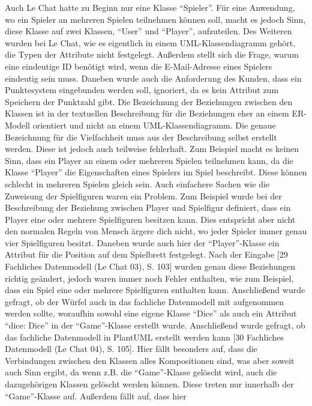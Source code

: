 Auch Le Chat hatte zu Beginn nur eine Klasse ``Spieler''. Für eine Anwendung, wo ein Spieler an mehreren Spielen teilnehmen können soll, 
macht es jedoch Sinn, diese Klasse auf zwei Klassen, ``User'' und ``Player'', aufzuteilen. Des Weiteren wurden bei Le Chat, wie es eigentlich 
in einem UML-Klassendiagramm gehört, die Typen der Attribute nicht festgelegt. Außerdem stellt sich die Frage, warum eine eindeutige 
ID benötigt wird, wenn die E-Mail-Adresse eines Spielers eindeutig sein muss. Daneben wurde auch die Anforderung des Kunden, dass ein 
Punktesystem eingebunden werden soll, ignoriert, da es kein Attribut zum Speichern der Punktzahl gibt. Die Bezeichnung der Beziehungen 
zwischen den Klassen ist in der textuellen Beschreibung für die Beziehungen eher an einem ER-Modell orientiert und nicht an einem 
UML-Klassendiagramm. Die genaue Bezeichnung für die Vielfachheit muss aus der Beschreibung selbst erstellt werden. Diese ist jedoch auch 
teilweise fehlerhaft. Zum Beispiel macht es keinen Sinn, dass ein Player an einem oder mehreren Spielen teilnehmen kann, da die Klasse 
``Player'' die Eigenschaften eines Spielers im Spiel beschreibt. Diese können schlecht in mehreren Spielen gleich sein. Auch einfachere 
Sachen wie die Zuweisung der Spielfiguren waren ein Problem. Zum Beispiel wurde bei der Beschreibung der Beziehung zwischen Player und 
Spielfigur definiert, dass ein Player eine oder mehrere Spielfiguren besitzen kann. Dies entspricht aber nicht den normalen Regeln von 
Mensch ärgere dich nicht, wo jeder Spieler immer genau vier Spielfiguren besitzt. Daneben wurde auch hier der ``Player''-Klasse ein Attribut 
für die Position auf dem Spielbrett festgelegt. Nach der Eingabe [29 Fachliches Datenmodell (Le Chat 03), S. 103] wurden genau diese 
Beziehungen richtig geändert, jedoch waren immer noch Fehler enthalten, wie zum Beispiel, dass ein Spiel eine oder mehrere Spielfiguren 
enthalten kann. Anschließend wurde gefragt, ob der Würfel auch in das fachliche Datenmodell mit aufgenommen werden sollte, woraufhin 
sowohl eine eigene Klasse ``Dice'' als auch ein Attribut ``dice: Dice'' in der ``Game''-Klasse erstellt wurde. Anschließend wurde gefragt, ob 
das fachliche Datenmodell in PlantUML erstellt werden kann [30 Fachliches Datenmodell (Le Chat 04), S. 105]. Hier fällt besonders auf, 
dass die Verbindungen zwischen den Klassen alles Kompositionen sind, was aber soweit auch Sinn ergibt, da wenn z.B. die ``Game''-Klasse 
gelöscht wird, auch die dazugehörigen Klassen gelöscht werden können. Diese treten nur innerhalb der ``Game''-Klasse auf. Außerdem fällt auf, dass hier 
